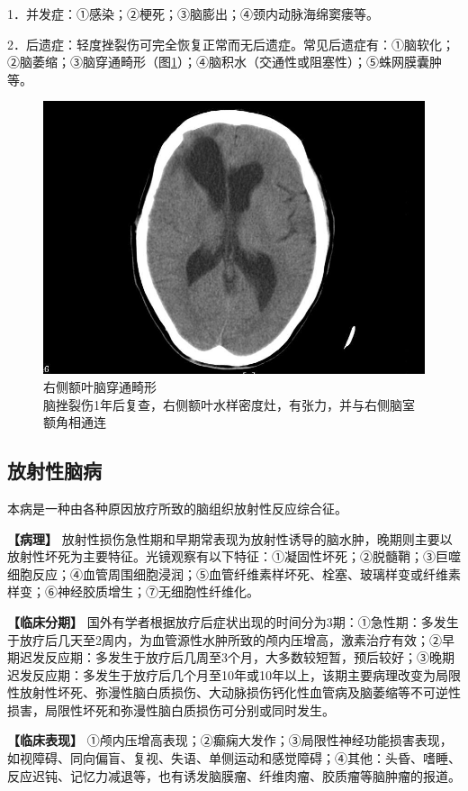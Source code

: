 1．并发症：①感染；②梗死；③脑膨出；④颈内动脉海绵窦瘘等。

2．后遗症：轻度挫裂伤可完全恢复正常而无后遗症。常见后遗症有：①脑软化；②脑萎缩；③脑穿通畸形（图\ref{fig2-37}）；④脑积水（交通性或阻塞性）；⑤蛛网膜囊肿等。

\begin{figure}[!htbp]
 \centering
 \includegraphics[width=.7\textwidth,height=\textheight,keepaspectratio]{./images/Image00058.jpg}
 \captionsetup{justification=centering}
 \caption{右侧额叶脑穿通畸形\\{\small 脑挫裂伤1年后复查，右侧额叶水样密度灶，有张力，并与右侧脑室额角相通连}}
 \label{fig2-37}
  \end{figure} 

\subsection{放射性脑病}

本病是一种由各种原因放疗所致的脑组织放射性反应综合征。

\textbf{【病理】}
放射性损伤急性期和早期常表现为放射性诱导的脑水肿，晚期则主要以放射性坏死为主要特征。光镜观察有以下特征：①凝固性坏死；②脱髓鞘；③巨噬细胞反应；④血管周围细胞浸润；⑤血管纤维素样坏死、栓塞、玻璃样变或纤维素样变；⑥神经胶质增生；⑦无细胞性纤维化。

\textbf{【临床分期】}
国外有学者根据放疗后症状出现的时间分为3期：①急性期：多发生于放疗后几天至2周内，为血管源性水肿所致的颅内压增高，激素治疗有效；②早期迟发反应期：多发生于放疗后几周至3个月，大多数较短暂，预后较好；③晚期迟发反应期：多发生于放疗后几个月至10年或10年以上，该期主要病理改变为局限性放射性坏死、弥漫性脑白质损伤、大动脉损伤钙化性血管病及脑萎缩等不可逆性损害，局限性坏死和弥漫性脑白质损伤可分别或同时发生。

\textbf{【临床表现】}
①颅内压增高表现；②癫痫大发作；③局限性神经功能损害表现，如视障碍、同向偏盲、复视、失语、单侧运动和感觉障碍；④其他：头昏、嗜睡、反应迟钝、记忆力减退等，也有诱发脑膜瘤、纤维肉瘤、胶质瘤等脑肿瘤的报道。

